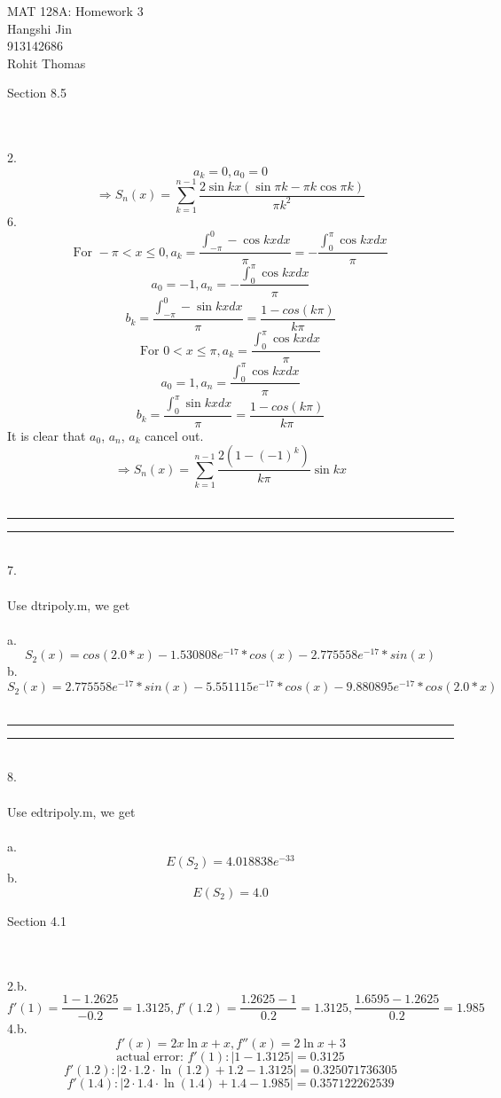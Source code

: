 \documentclass{article}
\begin{document}
\begin{flushright}MAT 128A: Homework 3\\ Hangshi Jin\\ 913142686\\ Rohit Thomas
\end{flushright}
\begin{large}Section 8.5\end{large}
\\\\
2.\[a_k=0,a_0=0\]
\[\Rightarrow S_n(x)=\sum^{n-1}_{k=1}\frac{2\sin{kx}(\sin{\pi k}-\pi k\cos{\pi k})}{\pi k^2}\]
6.
\[\text{For } -\pi<x\leq0, a_k=\frac{\int_{-\pi}^0-\cos{kx}dx}{\pi}=-\frac{\int_{0}^\pi\cos{kx}dx}{\pi}\]
\[a_0=-1,a_n=-\frac{\int_{0}^\pi\cos{kx}dx}{\pi}\]
\[b_k=\frac{\int_{-\pi}^0-\sin{kx}dx}{\pi}=\frac{1-cos(k\pi)}{k\pi}\]
\[\text{For } 0<x\leq\pi, a_k=\frac{\int_{0}^\pi\cos{kx}dx}{\pi}\]
\[a_0=1,a_n=\frac{\int_{0}^\pi\cos{kx}dx}{\pi}\]
\[b_k=\frac{\int_{0}^\pi\sin{kx}dx}{\pi}=\frac{1-cos(k\pi)}{k\pi}\]
It is clear that $a_0$, $a_n$, $a_k$ cancel out.
\[\Rightarrow S_n(x)=\sum^{n-1}_{k=1}\frac{2(1-(-1)^k)}{k\pi}\sin kx\]
\\\noindent\rule{16cm}{0.4pt}\noindent\rule{16cm}{0.4pt}
\\7.
\\\\Use dtripoly.m, we get\\\\
a.\[S_2(x)=cos(2.0*x) - 1.530808e^{-17}*cos(x) - 2.775558e^{-17}*sin(x)\]
b.\[S_2(x)=2.775558e^{-17}*sin(x) - 5.551115e^{-17}*cos(x) - 9.880895e^{-17}*cos(2.0*x)\]
\\\noindent\rule{16cm}{0.4pt}\noindent\rule{16cm}{0.4pt}\\
8.
\\\\Use edtripoly.m, we get\\\\
a.\[E(S_2)=4.018838e^{-33}\]
b.\[E(S_2)=4.0\]
\begin{large}Section 4.1\end{large}
\\\\2.b.\[f'(1)=\frac{1-1.2625}{-0.2}=1.3125,f'(1.2)=\frac{1.2625-1}{0.2}=1.3125,\frac{1.6595-1.2625}{0.2}=1.985\]
4.b.\[f'(x)=2x\ln x+x,f''(x)=2\ln x+3\]
\[\text{actual error: }f'(1):|1-1.3125|=0.3125\]
\[f'(1.2):|2\cdot1.2\cdot\ln\left(1.2\right)+1.2-1.3125|=0.325071736305\]
\[f'(1.4):|2\cdot1.4\cdot\ln\left(1.4\right)+1.4-1.985|=0.357122262539\]
\end{document}
